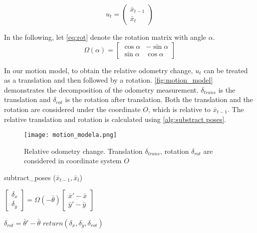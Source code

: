 \begin{equation}\label{eq:ut}
u_t = \begin{pmatrix}
\bar{x}_{t-1}\\ 
\bar{x}_{t}
\end{pmatrix}
\end{equation}

In the following, let \autoref{eq:rot} denote the rotation matrix with angle $\alpha$.
\begin{equation}\label{eq:rot}
\Omega(\alpha) = \begin{bmatrix}
\cos{\alpha} &  -\sin{\alpha} \\
\sin{\alpha} &  \cos{\alpha}
\end{bmatrix}
\end{equation}

In our motion model, to obtain the relative odometry change, $u_t$ can be treated as a translation and then followed by a rotation. \autoref{fig:motion_model} demonstrates the decomposition of the odometry measurement. $\delta_{trans}$ is the translation and $\delta_{rot}$ is the rotation after translation. Both the translation and the rotation are considered under the coordinate $O$, which is relative to $\bar{x}_{t-1}$. The relative translation and rotation is calculated using \autoref{alg:substract poses}.

\begin{figure}[h!]
  \centering
  \texttt{[image: motion\_modela.png]}
  \caption{Relative odometry change. Translation $\delta_{trans}$, rotation $\delta_{rot}$ are considered in coordinate system $O$}
  \label{fig:motion_model}
\end{figure}

\begin{algorithm}                      
  \caption{subtract\_poses ($\bar{x}_{t-1}, \bar{x}_{t}$)}         %
\label{alg:substract poses}                           
\begin{algorithmic}[1]  
\State $\begin{bmatrix}
\delta_{x}\\ 
\delta_{y}
\end{bmatrix}
=
\Omega(-\bar{\theta})
\begin{bmatrix}
\bar{x}' - \bar{x}\\ 
\bar{y}' - \bar{y}
\end{bmatrix}$

\State $\delta_{rot} = \bar{\theta}' - \bar{\theta}$
\State $return (\delta_{x}, \delta_{y}, \delta_{rot})$

\end{algorithmic}
\end{algorithm}

